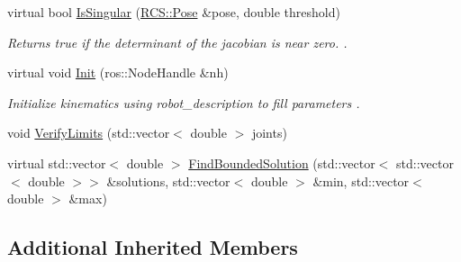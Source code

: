 \begin{DoxyCompactItemize}
virtual bool \hyperlink{classFastKinematics_a00652f1e5f1f7bfb9b450576beb7b71f}{Is\-Singular} (\hyperlink{namespaceRCS_aa07e45d8a50e30064283d2b38087f999}{R\-C\-S\-::\-Pose} \&pose, double threshold)
\begin{DoxyCompactList}\small\item\em Returns true if the determinant of the jacobian is near zero. . \end{DoxyCompactList}\item 
virtual void \hyperlink{classFastKinematics_af2de2a0ac3576faffa13dd5357561f78}{Init} (ros\-::\-Node\-Handle \&nh)
\begin{DoxyCompactList}\small\item\em Initialize kinematics using robot\-\_\-description to fill parameters . \end{DoxyCompactList}\item 
void \hyperlink{classFastKinematics_af9fd72624869d472acc17bfb14998b50}{Verify\-Limits} (std\-::vector$<$ double $>$ joints)
\item 
virtual std\-::vector$<$ double $>$ \hyperlink{classFastKinematics_a811d12eb6c664d72d4ae5a685d219185}{Find\-Bounded\-Solution} (std\-::vector$<$ std\-::vector$<$ double $>$$>$ \&solutions, std\-::vector$<$ double $>$ \&min, std\-::vector$<$ double $>$ \&max)
\end{DoxyCompactItemize}
\subsection*{Additional Inherited Members}


